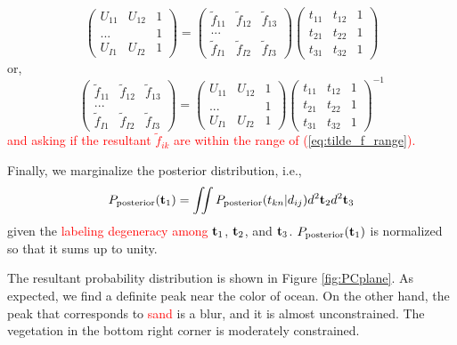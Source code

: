 \documentclass[iop,numberedappendix,apj]{emulateapj}
\def\fast{\tilde f}
\def\edit#1{\textcolor{red}{#1}}
\begin{document}
\begin{equation}
\begin{pmatrix}
U_{11} & U_{12} & 1 \\
... & & 1 \\
U_{I1} & U_{I2} & 1 
\end{pmatrix}
= 
\begin{pmatrix}
\fast_{11} & \fast_{12} & \fast_{13}  \\
... & \\
\fast_{I1} & \fast_{I2} & \fast_{I3}
\end{pmatrix}
\begin{pmatrix}
t_{11} & t_{12} & 1 \\
t_{21} & t_{22} & 1 \\
t_{31} & t_{32} & 1 
\end{pmatrix}
\end{equation}
or,
\begin{equation}
\begin{pmatrix}
\fast_{11} & \fast_{12} & \fast_{13}  \\
... & \\
\fast_{I1} & \fast_{I2} & \fast_{I3}
\end{pmatrix}
=
\begin{pmatrix}
U_{11} & U_{12} & 1 \\
... & & 1 \\
U_{I1} & U_{I2} & 1 
\end{pmatrix}
\begin{pmatrix}
t_{11} & t_{12} & 1 \\
t_{21} & t_{22} & 1 \\
t_{31} & t_{32} & 1 
\end{pmatrix}^{-1} 
\label{eq:f=ds-1}
\end{equation}
\edit{and asking if the resultant $\fast_{ik}$ are within the range of (\ref{eq:tilde_f_range}). }

Finally, we marginalize the posterior distribution, i.e.,
\begin{equation} 
P_{\rm posterior} ( {\bf t}_1) = \iint P_{\rm posterior} ( t_{kn} | d_{ij} ) d^2 {\bf t}_2 d^2 {\bf t}_3
\end{equation}
given the \edit{labeling degeneracy among} ${\bf t}_1$, ${\bf t}_2$, and ${\bf t}_3$. 
$P_{\rm posterior} ( {\bf t}_1) $ is normalized so that it sums up to unity. 

The resultant probability distribution is shown in Figure \ref{fig:PCplane}. 
As expected, we find a definite peak near the color of ocean. 
On the other hand, the peak that corresponds to \edit{sand} is a blur, and it is almost unconstrained. 
The vegetation in the bottom right corner is moderately constrained. 
\end{document}
